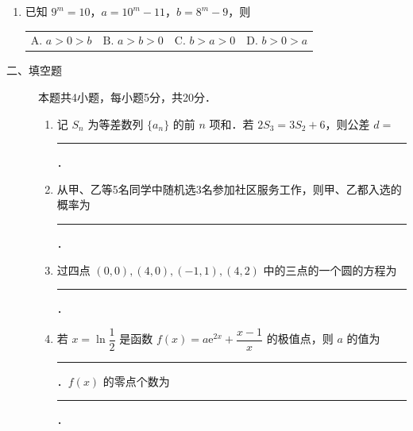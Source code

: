 \begin{description}
\begin{enumerate}[leftmargin=5pt]
        \item 已知 $9^m=10$，$a=10^m-11$，$b=8^m-9$，则
       
        {\centering\begin{tabular*}{\linewidth}{@{}@{\extracolsep{\fill}}llll@{}}
          \(\text{A. }a>0>b\)  & \(\text{B. }a>b>0\)  & \(\text{C. }b>a>0\)  & \(\text{D. }b>0>a\)
        \end{tabular*}\par}
    \end{enumerate}
\end{description}

\begin{description}
    \item[二、填空题] 本题共4小题，每小题5分，共20分．
    \begin{enumerate}[leftmargin=5pt]
      \addtocounter{enumi}{+12}
        \item 记 $S_n$ 为等差数列 $\{a_n\}$ 的前 $n$ 项和．若 $2S_3=3S_2+6$，则公差 $d=$ \rule[-0.3ex]{3em}{0.4pt}．
        \item 从甲、乙等5名同学中随机选3名参加社区服务工作，则甲、乙都入选的概率为 \rule[-0.3ex]{3em}{0.4pt}．
        \item 过四点 $(0,0),(4,0),(-1,1),(4,2)$ 中的三点的一个圆的方程为 \rule[-0.3ex]{3em}{0.4pt}．
        \item 若 $x=\ln\dfrac{1}{2}$ 是函数 $f(x)=a\mathrm{e}^{2x}+\dfrac{x-1}{x}$ 的极值点，则 $a$ 的值为 \rule[-0.3ex]{3em}{0.4pt}．$f(x)$ 的零点个数为 \rule[-0.3ex]{3em}{0.4pt}．
    \end{enumerate}
\end{description}

